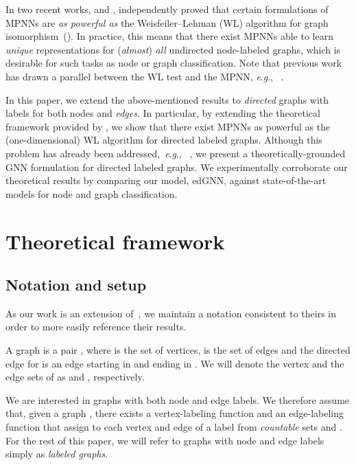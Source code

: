 \documentclass{article} \usepackage{iclr2019_conference,times}
\newcommand{\eg}{\textit{e}.\textit{g}., }
\begin{document}
In two recent works, \cite{Xu2018} and \cite{Morris2018}, independently proved that certain formulations of MPNNs are \emph{as powerful as} the Weisfeiler--Lehman (WL) algorithm for graph isomorphism~(\cite{Weisfeiler1968}). 
In practice, this means that there exist MPNNs able to learn \emph{unique} representations for 
(\emph{almost})
\emph{all}  undirected node-labeled graphs, which is desirable for such tasks as node or graph classification. 
Note that previous work has drawn a parallel between the WL test and the MPNN, \eg ~\cite{Hamilton2017, Jin2017, Lei2017}.

In this paper, we extend the above-mentioned results to \emph{directed} graphs with labels for both nodes and \emph{edges}. In particular, by extending the theoretical framework provided by \cite{Morris2018}, we show that there exist MPNNs as powerful as the (one-dimensional) WL algorithm for directed labeled graphs. Although this problem has already been addressed,~\eg~\cite{Li2015b, Niepert2016, Simonovsky2017, Beck2018, Schlichtkrull2018}, we present a theoretically-grounded GNN formulation for directed labeled graphs. We experimentally corroborate our theoretical results by comparing our model, edGNN, against state-of-the-art models for node and graph classification.












\section{Theoretical framework}
\subsection{Notation and setup}

As our work is an extension of~\cite{Morris2018}, we maintain a notation consistent to theirs in order to more easily reference their results. 

A graph  is a pair , where  is the set of vertices,  is the set of edges and the directed edge  for  is an edge starting in  and ending in . We will denote the vertex and the edge sets of  as  and , respectively.

We are interested in graphs with both node and edge labels. We therefore assume that, given a graph , there exists a vertex-labeling function  and an edge-labeling function  that assign to each vertex and edge of  a label from \emph{countable} sets  and . For the rest of this paper, we will refer to graphs with node and edge labels simply as \emph{labeled graphs}.
\end{document}
